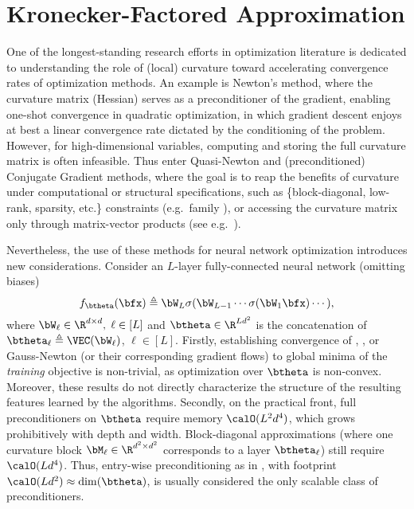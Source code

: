 \vspace{-0.3cm}
\section{Kronecker-Factored Approximation}
\label{sec:K-FAC-approx}

One of the longest-standing research efforts in optimization literature is dedicated to understanding the role of (local) curvature toward accelerating convergence rates of optimization methods. An example is Newton's method, where the curvature matrix (Hessian) serves as a preconditioner of the gradient, enabling one-shot convergence in quadratic optimization, in which gradient descent enjoys at best a linear convergence rate dictated by the conditioning of the problem.
However, for high-dimensional variables, computing and storing the full curvature matrix is often infeasible. Thus enter Quasi-Newton and (preconditioned) Conjugate Gradient methods, where the goal is to reap the benefits of curvature under  computational or structural specifications, such as \{block-diagonal, low-rank, sparsity, etc.\} constraints (e.g.\ \BFGS family \citep{goldfarb1970family, liu1989limited, nocedal1999numerical}), or accessing the curvature matrix only through matrix-vector products (see e.g.\ \citet{pearlmutter1994fast,schraudolph2002fast,martens2010deep}). 

Nevertheless, the use of these methods for neural network optimization introduces new considerations. Consider an $L$-layer fully-connected neural network (omitting biases) $$f_{\btheta}(\bfx) \triangleq \bW_L \sigma (\bW_{L-1} \cdots \sigma(\bW_1 \bfx) \cdots ),$$
where $\bW_\ell \in \R^{d \times d},\; \ell \in [L]$ and $\btheta \in \R^{L d^2}$ is the concatenation of $\btheta_\ell \triangleq \VEC(\bW_\ell)$, $\ell \in [L]$.
Firstly, establishing convergence of \SGD \citep{arora2019implicit}, \NGD \citep{zhang2019fast}, or Gauss-Newton \citep{cai2019gram} (or their corresponding gradient flows) to global minima of the \emph{training} objective is non-trivial, as optimization over $\btheta$ is non-convex. Moreover, these results do not directly characterize the structure of the resulting features learned by the algorithms.
Secondly, on the practical front, full preconditioners on $\btheta$ require memory $\calO(L^2 d^4)$, which grows prohibitively with depth and width. Block-diagonal approximations (where one curvature block $\bM_{\ell} \in \R^{d^2 \times d^2}$ corresponds to a layer $\btheta_\ell$) still require $\calO(L d^4)$. Thus, entry-wise preconditioning as in \Adam, with footprint $\calO(L d^2) \approx \dim(\btheta)$, is usually considered the only scalable class of preconditioners.


